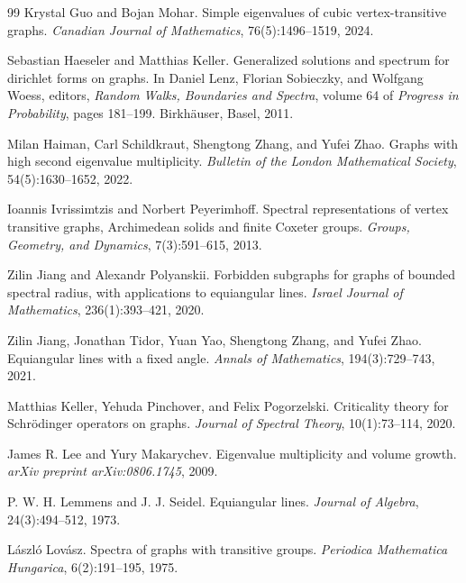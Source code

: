 \documentclass[11pt]{article}
\theoremstyle{definition}
\theoremstyle{remark}
\begin{document}
\begin{thebibliography}{99}
Krystal Guo and Bojan Mohar.
\newblock Simple eigenvalues of cubic vertex-transitive graphs.
\newblock \emph{Canadian Journal of Mathematics}, 76(5):1496--1519, 2024.

Sebastian Haeseler and Matthias Keller.
\newblock Generalized solutions and spectrum for dirichlet forms on graphs.
\newblock In Daniel Lenz, Florian Sobieczky, and Wolfgang Woess, editors, \emph{Random Walks, Boundaries and Spectra}, volume 64 of \emph{Progress in Probability}, pages 181--199. Birkh{\"a}user, Basel, 2011.

Milan Haiman, Carl Schildkraut, Shengtong Zhang, and Yufei Zhao.
\newblock Graphs with high second eigenvalue multiplicity.
\newblock \emph{Bulletin of the London Mathematical Society}, 54(5):1630--1652, 2022.

Ioannis Ivrissimtzis and Norbert Peyerimhoff.
\newblock Spectral representations of vertex transitive graphs, {Archimedean} solids and finite {Coxeter} groups.
\newblock \emph{Groups, Geometry, and Dynamics}, 7(3):591--615, 2013.

Zilin Jiang and Alexandr Polyanskii.
\newblock Forbidden subgraphs for graphs of bounded spectral radius, with applications to equiangular lines.
\newblock \emph{Israel Journal of Mathematics}, 236(1):393--421, 2020.

Zilin Jiang, Jonathan Tidor, Yuan Yao, Shengtong Zhang, and Yufei Zhao.
\newblock Equiangular lines with a fixed angle.
\newblock \emph{Annals of Mathematics}, 194(3):729--743, 2021.

Matthias Keller, Yehuda Pinchover, and Felix Pogorzelski.
\newblock Criticality theory for {Schr{\"o}dinger} operators on graphs.
\newblock \emph{Journal of Spectral Theory}, 10(1):73--114, 2020.

James R. Lee and Yury Makarychev.
\newblock Eigenvalue multiplicity and volume growth.
\newblock \emph{arXiv preprint arXiv:0806.1745}, 2009.

P. W. H. Lemmens and J. J. Seidel.
\newblock Equiangular lines.
\newblock \emph{Journal of Algebra}, 24(3):494--512, 1973.

L{\'a}szl{\'o} Lov{\'a}sz.
\newblock Spectra of graphs with transitive groups.
\newblock \emph{Periodica Mathematica Hungarica}, 6(2):191--195, 1975.


\end{thebibliography}
\end{document}
